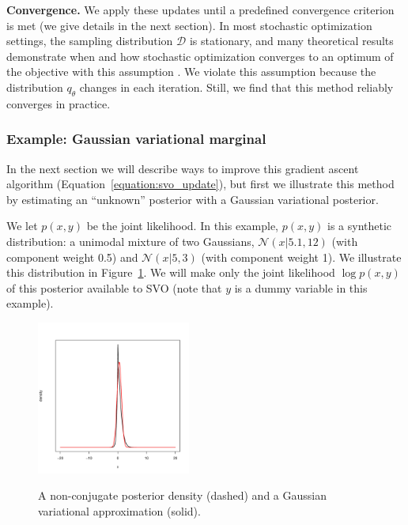 \textbf{Convergence.} We apply these updates until a predefined
convergence criterion is met (we give details in the next section).
In most stochastic optimization settings, the sampling distribution
$\mathcal{D}$ is stationary, and many theoretical results demonstrate
when and how stochastic optimization converges to an optimum of the
objective with this assumption \cite{bottou:2004,robbins:1951}.  We
violate this assumption because the distribution $q_\theta$ changes in
each iteration.  Still, we find that this method reliably converges in
practice.

\subsubsection{Example: Gaussian variational marginal}
\label{section:gaussian}
In the next section we will describe ways to improve this gradient
ascent algorithm (Equation~\ref{equation:svo_update}), but first we
illustrate this method by estimating an ``unknown'' posterior with a
Gaussian variational posterior.

We let $p(x, y)$ be the joint likelihood. In this example, $p(x, y)$
is a synthetic distribution: a unimodal mixture of two Gaussians,
$\mathcal{N}(x | 5.1, 12)$ (with component weight 0.5) and
$\mathcal{N}(x | 5, 3)$ (with component weight 1).  We illustrate this
distribution in
Figure~\ref{figure:univariate_comparison_approximation}.  We will make
only the joint likelihood $\log p(x, y)$ of this posterior available
to SVO (note that $y$ is a dummy variable in this example).
\begin{figure}[t!]
  \center
  \vspace{-32pt}
  \includegraphics[width=0.45\textwidth,height=0.21\textheight]{chapter_stochastic_variational_optimization/figures/laplace_approximation.pdf} \\
  \vspace{-20pt}
  \caption{A non-conjugate posterior density (dashed) and a Gaussian
  variational approximation (solid).}
  \label{figure:univariate_comparison_approximation}
\end{figure}

